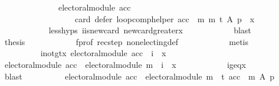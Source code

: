 \begin{isabellebody}
\ \ \ \ \ \ \ \ \ \ \ \ \ \ electoral{\isacharunderscore}{\kern0pt}module\ acc{\isacharparenright}{\kern0pt}\ {\isasymlongrightarrow}\isanewline
\ \ \ \ \ \ \ \ \ \ \ \ \ \ \ \ \ \ card\ {\isacharparenleft}{\kern0pt}defer\ {\isacharparenleft}{\kern0pt}loop{\isacharunderscore}{\kern0pt}comp{\isacharunderscore}{\kern0pt}helper\ {\isacharparenleft}{\kern0pt}acc\ {\isasymtriangleright}\ m{\isacharparenright}{\kern0pt}\ m\ t{\isacharparenright}{\kern0pt}\ A\ p{\isacharparenright}{\kern0pt}\ {\isacharequal}{\kern0pt}\ x{\isachardoublequoteclose}\isanewline
\ \ \ \ \ \ \ \ \ \ \isamarkupfalse%
\ less{\isachardot}{\kern0pt}hyps\ i{\isacharunderscore}{\kern0pt}is{\isacharunderscore}{\kern0pt}new{\isacharunderscore}{\kern0pt}card\ new{\isacharunderscore}{\kern0pt}card{\isacharunderscore}{\kern0pt}greater{\isacharunderscore}{\kern0pt}x\isanewline
\ \ \ \ \ \ \ \ \ \ \isamarkupfalse%
\ blast\isanewline
\ \ \ \ \ \ \ \ \isamarkupfalse%
\ {\isacharquery}{\kern0pt}thesis\isanewline
\ \ \ \ \ \ \ \ \ \ \isamarkupfalse%
\ f{\isacharunderscore}{\kern0pt}prof\ rec{\isacharunderscore}{\kern0pt}step\ non{\isacharunderscore}{\kern0pt}electing{\isacharunderscore}{\kern0pt}def\isanewline
\ \ \ \ \ \ \ \ \ \ \isamarkupfalse%
\ metis\isanewline
\ \ \ \ \ \ \isamarkupfalse%
\isanewline
\ \ \ \ \ \ \ \ \isamarkupfalse%
\ i{\isacharunderscore}{\kern0pt}not{\isacharunderscore}{\kern0pt}gt{\isacharunderscore}{\kern0pt}x{\isacharcolon}{\kern0pt}\ {\isachardoublequoteopen}{\isasymnot}{\isacharparenleft}{\kern0pt}electoral{\isacharunderscore}{\kern0pt}module\ acc\ {\isasymlongrightarrow}\ i\ {\isachargreater}{\kern0pt}\ x{\isacharparenright}{\kern0pt}{\isachardoublequoteclose}\isanewline
\ \ \ \ \ \ \ \ \isamarkupfalse%
\ {\isachardoublequoteopen}electoral{\isacharunderscore}{\kern0pt}module\ acc\ {\isasymand}\ electoral{\isacharunderscore}{\kern0pt}module\ m\ {\isasymlongrightarrow}\ i\ {\isacharequal}{\kern0pt}\ x{\isachardoublequoteclose}\isanewline
\ \ \ \ \ \ \ \ \ \ \isamarkupfalse%
\ i{\isacharunderscore}{\kern0pt}geq{\isacharunderscore}{\kern0pt}x\isanewline
\ \ \ \ \ \ \ \ \ \ \isamarkupfalse%
\ blast\isanewline
\ \ \ \ \ \ \ \ \isamarkupfalse%
\ {\isachardoublequoteopen}electoral{\isacharunderscore}{\kern0pt}module\ acc\ {\isasymand}\ electoral{\isacharunderscore}{\kern0pt}module\ m\ {\isasymlongrightarrow}\ t\ {\isacharparenleft}{\kern0pt}{\isacharparenleft}{\kern0pt}acc\ {\isasymtriangleright}\ m{\isacharparenright}{\kern0pt}\ A\ p{\isacharparenright}{\kern0pt}{\isachardoublequoteclose}\isanewline

\end{isabellebody}
